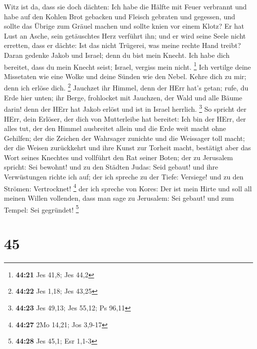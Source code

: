 Witz ist da, dass sie doch dächten: Ich habe die Hälfte mit Feuer
verbrannt und habe auf den Kohlen Brot gebacken und Fleisch gebraten und
gegessen, und sollte das Übrige zum Gräuel machen und sollte knien vor
einem Klotz?  Er hat Lust an Asche, sein getäuschtes Herz
verführt ihn; und er wird seine Seele nicht erretten, dass er dächte:
Ist das nicht Trügerei, was meine rechte Hand treibt? 
Daran gedenke Jakob und Israel; denn du bist mein Knecht. Ich habe dich
bereitet, dass du mein Knecht seist; Israel, vergiss mein nicht.
\footnote{\textbf{44:21} Jes 41,8; Jes 44,2}  Ich vertilge
deine Missetaten wie eine Wolke und deine Sünden wie den Nebel. Kehre
dich zu mir; denn ich erlöse dich. \footnote{\textbf{44:22} Jes 1,18;
  Jes 43,25}  Jauchzet ihr Himmel, denn der HErr hat's
getan; rufe, du Erde hier unten; ihr Berge, frohlocket mit Jauchzen, der
Wald und alle Bäume darin! denn der HErr hat Jakob erlöst und ist in
Israel herrlich. \footnote{\textbf{44:23} Jes 49,13; Jes 55,12; Ps 96,11}
 So spricht der HErr, dein Erlöser, der dich von
Mutterleibe hat bereitet: Ich bin der HErr, der alles tut, der den
Himmel ausbreitet allein und die Erde weit macht ohne Gehilfen;
 der die Zeichen der Wahrsager zunichte und die Weissager
toll macht; der die Weisen zurückkehrt und ihre Kunst zur Torheit macht,
 bestätigt aber das Wort seines Knechtes und vollführt den
Rat seiner Boten; der zu Jerusalem spricht: Sei bewohnt! und zu den
Städten Judas: Seid gebaut! und ihre Verwüstungen richte ich auf;
 der ich spreche zu der Tiefe: Versiege! und zu den
Strömen: Vertrocknet! \footnote{\textbf{44:27} 2Mo 14,21; Jos 3,9-17}
 der ich spreche von Kores: Der ist mein Hirte und soll all
meinen Willen vollenden, dass man sage zu Jerusalem: Sei gebaut! und zum
Tempel: Sei gegründet! \footnote{\textbf{44:28} Jes 45,1; Esr 1,1-3}

\hypertarget{section-15}{%
\section{45}\label{section-15}}

